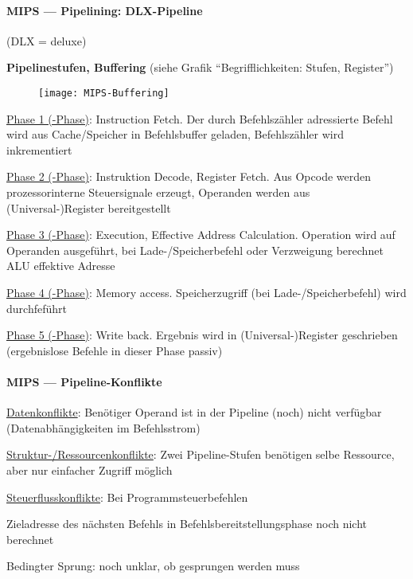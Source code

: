 \paragraph{MIPS --- Pipelining: DLX-Pipeline} (DLX = deluxe)
\begin{items}
  \item \textbf{Pipelinestufen, Buffering} (siehe Grafik "`Begrifflichkeiten: Stufen, Register"')
  \begin{figure}[H]\centering\label{MIPS-Buffering}\texttt{[image: MIPS-Buffering]}\end{figure}
  \begin{enumeration}
    \item \underline{Phase 1 (-Phase)}: Instruction Fetch. Der durch Befehlszähler adressierte Befehl wird aus Cache/Speicher in Befehlsbuffer geladen, Befehlszähler wird inkrementiert
    \item \underline{Phase 2 (-Phase)}: Instruktion Decode, Register Fetch. Aus Opcode werden prozessorinterne Steuersignale erzeugt, Operanden werden aus (Universal-)Register bereitgestellt
    \item \underline{Phase 3 (-Phase)}: Execution, Effective Address Calculation. Operation wird auf Operanden ausgeführt, bei Lade-/Speicherbefehl oder Verzweigung berechnet ALU effektive Adresse
    \item \underline{Phase 4 (-Phase)}: Memory access. Speicherzugriff (bei Lade-/Speicherbefehl) wird durchfeführt
    \item \underline{Phase 5 (-Phase)}: Write back. Ergebnis wird in (Universal-)Register geschrieben (ergebnislose Befehle in dieser Phase passiv)
  \end{enumeration}
\end{items}

\newpage

\paragraph{MIPS --- Pipeline-Konflikte}
\begin{items}
  \item \underline{Datenkonflikte}: Benötiger Operand ist in der Pipeline (noch) nicht verfügbar (Datenabhängigkeiten im Befehlsstrom)
  \item \underline{Struktur-/Ressourcenkonflikte}: Zwei Pipeline-Stufen benötigen selbe Ressource, aber nur einfacher Zugriff möglich
  \item \underline{Steuerflusskonflikte}: Bei Programmsteuerbefehlen
  \begin{enumeration}
    \item Zieladresse des nächsten Befehls in Befehlsbereitstellungsphase noch nicht berechnet
    \item Bedingter Sprung: noch unklar, ob gesprungen werden muss
  \end{enumeration}
\end{items}

